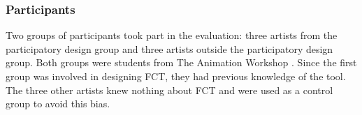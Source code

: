 \subsubsection{Participants}
Two groups of participants took part in the evaluation: three artists from the participatory design group and three artists outside the participatory design group. Both groups were students from The Animation Workshop \cite{taw_degrees}. Since the first group was involved in designing FCT, they had previous knowledge of the tool. The three other artists knew nothing about FCT and were used as a control group to avoid this bias.